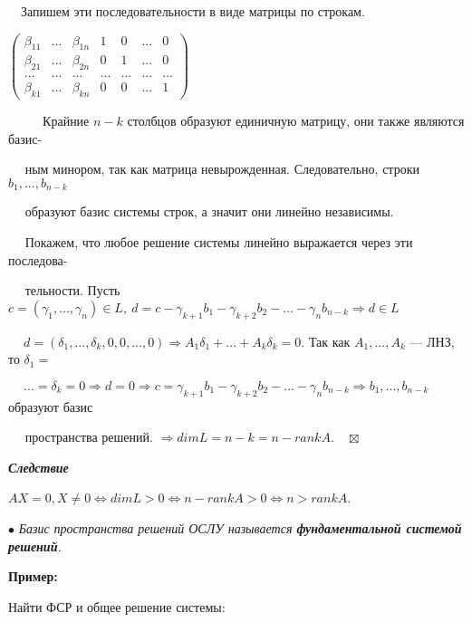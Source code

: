 \documentclass[a4paper, 12pt]{report}
\begin{document}
	$\quad$Запишем эти последовательности в виде матрицы по строкам.
	\begin{center}
		$\begin{pmatrix} \beta_{11} & ... & \beta_{1n} & 1 & 0 & ... & 0 \\ \beta_{21} & ... & \beta_{2n} & 0 & 1 & ... & 0 \\... & ... & ... & ... & ... & ... & ...\\ \beta_{k1} & ... & \beta_{kn} & 0 & 0 & ... & 1 \end{pmatrix}$
	\end{center}
	$\qquad \, \ $ Крайние $n-k$ столбцов образуют единичную матрицу, они также являются базис-
	
	$\quad$ ным минором, так как матрица невырожденная. Следовательно, строки $b_1,...,b_{n-k}$ 
	
	$\quad$ образуют базис системы строк, а значит они линейно независимы.
	
	$\quad$ Покажем, что любое решение системы линейно выражается через эти последова-
	
	$\quad$ тельности. Пусть $c = (\gamma_1,...,\gamma_n)\in L, \ d = c - \gamma_{k+1}b_1 - \gamma_{k+2}b_2 - ... - \gamma_nb_{n-k}\Rightarrow d \in L$
	
	$\quad\  d = (\delta_1,...,\delta_k,0,0,...,0) \Rightarrow A_1\delta_1 + ... + A_k\delta_k = 0.$ Так как $A_1,...,A_k$ --- ЛНЗ, то $\delta_1=$
	
	$\quad\ ...=\delta_k=0 \Rightarrow d=0\Rightarrow  c=\gamma_{k+1}b_1 - \gamma_{k+2}b_2 - ... - \gamma_nb_{n-k} \Rightarrow b_1,...,b_{n-k}$ образуют базис 
	
	$\quad$ пространства решений. $\Rightarrow dimL = n-k = n - rankA. \quad \boxtimes$ 
	
	
	
	
	
	\par\bigskip
	\textit{\textbf{Следствие}}
	
	$AX = 0, X \ne 0 \Longleftrightarrow dimL > 0 \Longleftrightarrow n-rankA>0 \Longleftrightarrow n > rankA$.
	\par\bigskip
	$\bullet$\textit{ Базис пространства решений ОСЛУ называется \textbf{фундаментальной системой решений}.}
	\par\bigskip
	\textbf{Пример:}
	
	Найти ФСР и общее решение системы:
	
\end{document}
